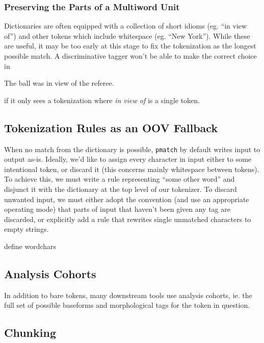 \documentclass{llncs}
\begin{document}
\subsubsection{Preserving the Parts of a Multiword Unit}

Dictionaries are often equipped with a collection of short idioms (eg.\@
``in view of'') and other tokens which include whitespace (eg.\@
``New York''). While these are useful, it may be too early at this stage
to fix the tokenization as the longest possible match. A discriminative
tagger won't be able to make the correct choice in

\begin{exe}
  \item The ball was in view of the referee.
\end{exe}

if it only sees a tokenization where \emph{in view of} is a single token.

\subsection{Tokenization Rules as an OOV Fallback}

When no match from the dictionary is possible, \verb+pmatch+ by default
writes input to output as-is. Ideally, we'd like to assign every character
in input either to some intentional token, or discard it (this concerns mainly
whitespace between tokens). To achieve this, we must write a rule representing
``some other word'' and disjunct it with the dictionary at the top level of
our tokenizer. To discard unwanted input, we must either adopt the convention
(and use an appropriate operating mode) that parts of input that haven't been
given any tag are discarded, or explicitly add a rule that rewrites single
unmatched characters to empty strings.

\begin{framed}
define wordchars 
\end{framed}

\subsection{Analysis Cohorts}

In addition to bare tokens, many downstream tools use analysis cohorts, ie.\@
the full set of possible baseforms and morphological tags for the token in
question.

\subsection{Chunking}
\end{document}
